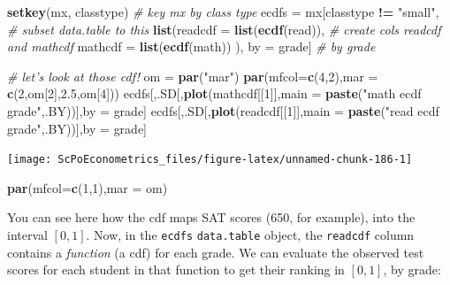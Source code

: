 \documentclass[]{book}
\newenvironment{Shaded}{\begin{snugshade}}{\end{snugshade}}
\newcommand{\CommentTok}[1]{\textcolor[rgb]{0.56,0.35,0.01}{\textit{#1}}}
\newcommand{\DataTypeTok}[1]{\textcolor[rgb]{0.13,0.29,0.53}{#1}}
\newcommand{\DecValTok}[1]{\textcolor[rgb]{0.00,0.00,0.81}{#1}}
\newcommand{\FloatTok}[1]{\textcolor[rgb]{0.00,0.00,0.81}{#1}}
\newcommand{\KeywordTok}[1]{\textcolor[rgb]{0.13,0.29,0.53}{\textbf{#1}}}
\newcommand{\NormalTok}[1]{#1}
\newcommand{\OperatorTok}[1]{\textcolor[rgb]{0.81,0.36,0.00}{\textbf{#1}}}
\newcommand{\StringTok}[1]{\textcolor[rgb]{0.31,0.60,0.02}{#1}}
\begin{document}
\begin{Shaded}
\begin{Highlighting}[]
\KeywordTok{setkey}\NormalTok{(mx, classtype)  }\CommentTok{# key mx by class type}
\NormalTok{ecdfs =}\StringTok{ }\NormalTok{mx[classtype }\OperatorTok{!=}\StringTok{ "small"}\NormalTok{,        }\CommentTok{# subset data.table to this}
    \KeywordTok{list}\NormalTok{(}\DataTypeTok{readcdf =} \KeywordTok{list}\NormalTok{(}\KeywordTok{ecdf}\NormalTok{(read)),    }\CommentTok{# create cols readcdf and mathcdf}
         \DataTypeTok{mathcdf =} \KeywordTok{list}\NormalTok{(}\KeywordTok{ecdf}\NormalTok{(math))}
\NormalTok{         ),}
\NormalTok{         by =}\StringTok{ }\NormalTok{grade]    }\CommentTok{# by grade}

\CommentTok{# let's look at those cdf!}
\NormalTok{om =}\StringTok{ }\KeywordTok{par}\NormalTok{(}\StringTok{"mar"}\NormalTok{)}
\KeywordTok{par}\NormalTok{(}\DataTypeTok{mfcol=}\KeywordTok{c}\NormalTok{(}\DecValTok{4}\NormalTok{,}\DecValTok{2}\NormalTok{),}\DataTypeTok{mar =} \KeywordTok{c}\NormalTok{(}\DecValTok{2}\NormalTok{,om[}\DecValTok{2}\NormalTok{],}\FloatTok{2.5}\NormalTok{,om[}\DecValTok{4}\NormalTok{]))}
\NormalTok{ecdfs[,.SD[,}\KeywordTok{plot}\NormalTok{(mathcdf[[}\DecValTok{1}\NormalTok{]],}\DataTypeTok{main =} \KeywordTok{paste}\NormalTok{(}\StringTok{"math ecdf grade"}\NormalTok{,.BY))],by =}\StringTok{ }\NormalTok{grade]}
\NormalTok{ecdfs[,.SD[,}\KeywordTok{plot}\NormalTok{(readcdf[[}\DecValTok{1}\NormalTok{]],}\DataTypeTok{main =} \KeywordTok{paste}\NormalTok{(}\StringTok{"read ecdf grade"}\NormalTok{,.BY))],by =}\StringTok{ }\NormalTok{grade]}
\end{Highlighting}
\end{Shaded}

\begin{center}\texttt{[image: ScPoEconometrics\_files/figure-latex/unnamed-chunk-186-1]} \end{center}

\begin{Shaded}
\begin{Highlighting}[]
\KeywordTok{par}\NormalTok{(}\DataTypeTok{mfcol=}\KeywordTok{c}\NormalTok{(}\DecValTok{1}\NormalTok{,}\DecValTok{1}\NormalTok{),}\DataTypeTok{mar =}\NormalTok{ om)}
\end{Highlighting}
\end{Shaded}

You can see here how the cdf maps SAT scores (650, for example), into the interval \([0,1]\). Now, in the \texttt{ecdfs} \texttt{data.table} object, the \texttt{readcdf} column contains a \emph{function} (a cdf) for each grade. We can evaluate the observed test scores for each student in that function to get their ranking in \([0,1]\), by grade:
\end{document}
